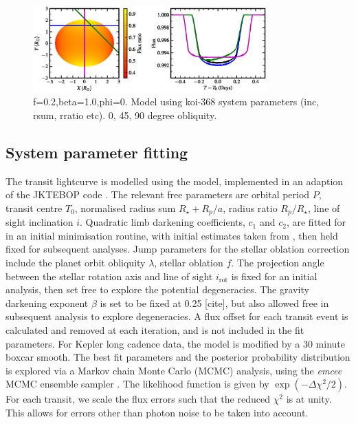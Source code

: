 \documentclass[apjl]{emulateapj}
\begin{document}
\begin{figure}
  \centering
  \includegraphics[width=9cm]{obliq_model.eps}
  \caption{f=0.2,beta=1.0,phi=0. Model using koi-368 system
    parameters (inc, rsum, rratio etc). 0, 45, 90 degree obliquity.}
  \label{fig:obliqmodel}
\end{figure}

\subsection{System parameter fitting}
\label{sec:model-fitting}

The transit lightcurve is modelled using the
\citet{Nelson1972} model, implemented in an adaption of the
JKTEBOP code \citep{Proper1981,Southworth2004}. The
relevant free parameters are orbital period $P$, transit centre $T_0$,
normalised radius sum $R_\star+R_p / a$, radius ratio $R_p/R_\star$,
line of sight inclination $i$. Quadratic limb darkening coefficients,
$c_1$ and $c_2$, 
are fitted for in an initial minimisation routine, with initial
estimates taken from \citet{Sing2010}, then held fixed for subsequent analyses. Jump
parameters for the stellar oblation correction include the planet
orbit obliquity $\lambda$, stellar oblation $f$. The projection angle
between the stellar rotation axis and line of sight $i_\text{rot}$ is
fixed for an initial analysis, then set free to explore the potential
degeneracies. The gravity darkening exponent $\beta$ is set to be
fixed at 0.25 [cite], but also allowed free in subsequent analysis to
explore degeneracies. A flux offset for each transit event is calculated and
removed at each iteration, and is not included in the fit
parameters. For Kepler long cadence data, the model is modified by a
30 minute boxcar smooth. The best fit parameters and the posterior
probability distribution is explored via a Markov chain Monte Carlo
(MCMC) analysis, using the \emph{emcee} MCMC ensemble sampler
\citep{ForemanMackey2012}. The likelihood function is given by
$\exp(-\Delta\chi^2/2)$. For each transit, we scale the flux errors such
that the reduced $\chi^2$ is at unity. This allows for errors other
than photon noise to be taken into account.
\end{document}
